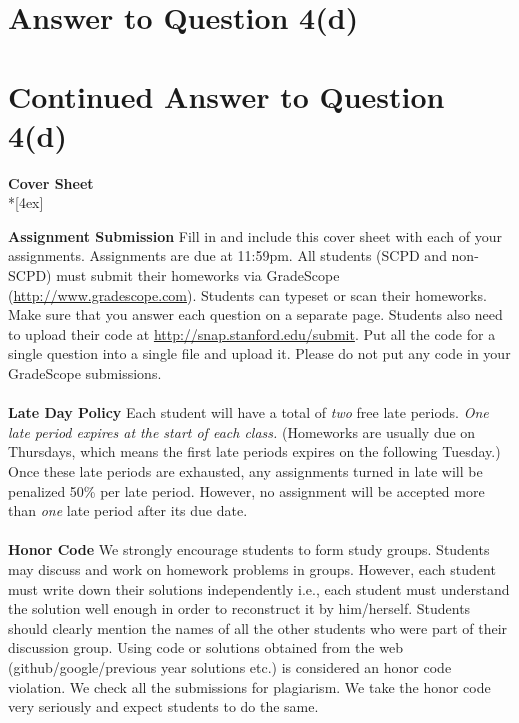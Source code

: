 \documentclass[11pt]{article}
\begin{document}
\pagebreak[4]
\section*{Answer to Question 4(d)}

\pagebreak[4]
\section*{Continued Answer to Question 4(d)}

\pagebreak[4]
\begin{center}
\LARGE{\bf \textsf{Cover Sheet}} \\*[4ex]
\end{center}

\textbf{Assignment Submission } Fill in and include this cover sheet with each of your assignments. Assignments are due at 11:59pm. All students (SCPD and non-SCPD) must submit their homeworks via GradeScope (\url{http://www.gradescope.com}). Students can typeset or scan their homeworks. Make sure that you answer each question on a separate page. Students also need to upload their code at \url{http://snap.stanford.edu/submit}. Put all the code for a single question into a single file and upload it. Please do not put any code in your GradeScope submissions. 
\\
\\
\textbf{Late Day Policy } Each student will have a total of {\em two} free late periods. {\em One late period expires at the start of each class.} (Homeworks are usually due on Thursdays, which means the first late periods expires on the following Tuesday.) Once these late periods are exhausted, any assignments turned in late will be penalized 50\% per late period. However, no assignment will be accepted more than {\em one} late period after its due date. 
\\
\\
\textbf{Honor Code } We strongly encourage students to form study groups. Students may discuss and work on homework problems in groups. However, each student must write down their solutions independently i.e., each student must understand the solution well enough in order to reconstruct it by him/herself.  Students should clearly mention the names of all the other students who were part of their discussion group. Using code or solutions obtained from the web (github/google/previous year solutions etc.) is considered an honor code violation. We check all the submissions for plagiarism. We take the honor code very seriously and expect students to do the same. 
\end{document}
